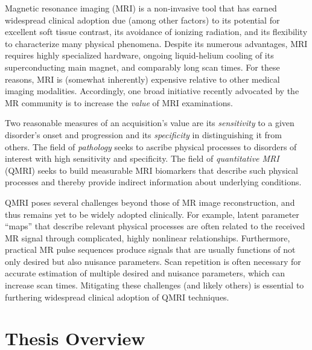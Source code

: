 
Magnetic resonance imaging (MRI)
is a non-invasive tool
that has earned widespread clinical adoption
due (among other factors) 
to its potential for excellent soft tissue contrast,
its avoidance of ionizing radiation,
and its flexibility to characterize many physical phenomena. 
Despite its numerous advantages,
MRI requires highly specialized hardware,
ongoing liquid-helium cooling
of its superconducting main magnet,
and comparably long scan times.
For these reasons,
MRI is (somewhat inherently) expensive relative
to other medical imaging modalities.
Accordingly,
one broad initiative 
recently advocated by the MR community 
is to increase the \emph{value}
of MRI examinations.

Two reasonable measures
of an acquisition's value
are its \emph{sensitivity}
to a given disorder's onset and progression
and its \emph{specificity}
in distinguishing it
from others.
The field of \emph{pathology}
seeks to ascribe physical processes
to disorders of interest
with high sensitivity and specificity.
The field of \emph{quantitative MRI} (QMRI)
seeks to build measurable MRI biomarkers
that describe such physical processes
and thereby provide indirect information
about underlying conditions.

QMRI poses several challenges
beyond those of MR image reconstruction,
and thus remains yet to be widely adopted clinically.
For example, latent parameter ``maps'' 
that describe relevant physical processes
are often related to the received MR signal
through complicated, 
highly nonlinear relationships. 
Furthermore,
practical MR pulse sequences
produce signals
that are usually functions
of not only desired
but also nuisance parameters.
Scan repetition is often necessary
for accurate estimation
of multiple desired and nuisance parameters,
which can increase scan times.
Mitigating these challenges 
(and likely others)
is essential
to furthering widespread clinical adoption
of QMRI techniques.

\section{Thesis Overview}
\label{s,intro,over}


